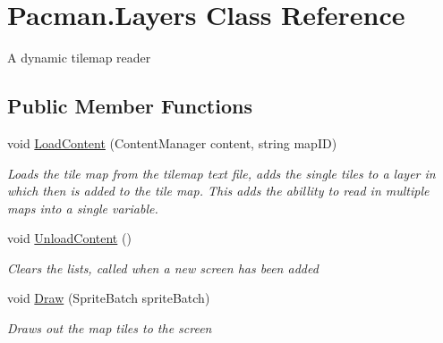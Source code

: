 \hypertarget{class_pacman_1_1_layers}{\section{Pacman.\-Layers Class Reference}
\label{class_pacman_1_1_layers}
}


A dynamic tilemap reader  


\subsection*{Public Member Functions}
\begin{DoxyCompactItemize}
\item 
void \hyperlink{class_pacman_1_1_layers_ae2f8d76ad9fe571a7e0ead57165b402e}{Load\-Content} (Content\-Manager content, string map\-I\-D)
\begin{DoxyCompactList}\small\item\em Loads the tile map from the tilemap text file, adds the single tiles to a layer in which then is added to the tile map. This adds the abillity to read in multiple maps into a single variable. \end{DoxyCompactList}\item 
void \hyperlink{class_pacman_1_1_layers_a721d7d396fb04ab363d485d8474f51a2}{Unload\-Content} ()
\begin{DoxyCompactList}\small\item\em Clears the lists, called when a new screen has been added \end{DoxyCompactList}\item 
void \hyperlink{class_pacman_1_1_layers_a3b799c4834f790a0de8dfdbec02d4974}{Draw} (Sprite\-Batch sprite\-Batch)
\begin{DoxyCompactList}\small\item\em Draws out the map tiles to the screen \end{DoxyCompactList}\end{DoxyCompactItemize}
